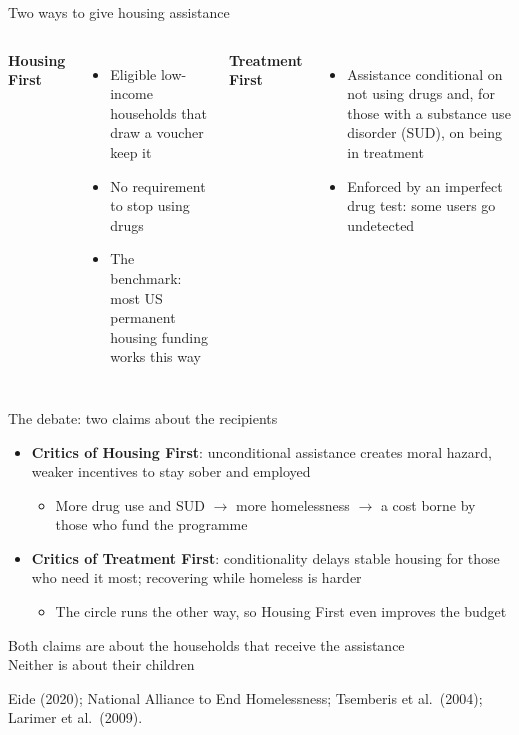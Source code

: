 \documentclass[aspectratio=169,11pt]{beamer}
\newcommand{\HF}{Housing First}
\newcommand{\TF}{Treatment First}
\newcommand{\source}[1]{\par\vfill{\color{lgrey}\tiny #1}}
\begin{document}
\begin{frame}{Two ways to give housing assistance}
\begin{columns}[T]
\textbf{\color{hfblue}\HF{}}
\begin{itemize}
\item Eligible low-income households that draw a voucher keep it
\item No requirement to stop using drugs
\item The benchmark: most US permanent housing funding works this way
\end{itemize}
\textbf{\color{tforange}\TF{}}
\begin{itemize}
\item Assistance conditional on not using drugs and, for those with a substance use disorder (SUD), on being in treatment
\item Enforced by an imperfect drug test: some users go undetected
\end{itemize}
\end{columns}
\end{frame}

\begin{frame}{The debate: two claims about the recipients}
\begin{itemize}\setlength\itemsep{0.6em}
\item \textbf{Critics of \HF{}}: unconditional assistance creates \alert{moral hazard}, weaker incentives to stay sober and employed
\begin{itemize}
\item More drug use and SUD $\to$ more homelessness $\to$ a cost borne by those who fund the programme
\end{itemize}
\item \textbf{Critics of \TF{}}: conditionality delays stable housing for those who need it most; recovering while homeless is harder
\begin{itemize}
\item The circle runs the other way, so \HF{} even improves the budget
\end{itemize}
\end{itemize}
\vspace{0.4cm}
Both claims are about the households that receive the assistance\\[0.2em]
\alert{Neither is about their children}
\source{Eide (2020); National Alliance to End Homelessness; Tsemberis et al.\ (2004); Larimer et al.\ (2009).}
\end{frame}
\end{document}
